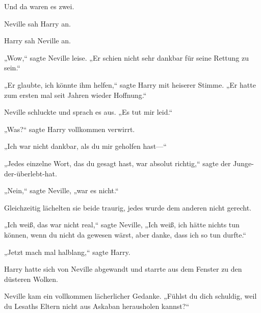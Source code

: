 Und da waren es zwei.

Neville sah Harry an.

Harry sah Neville an.

„Wow,“ sagte Neville leise. „Er schien nicht sehr dankbar für seine Rettung zu sein.“

„Er glaubte, ich könnte ihm helfen,“ sagte Harry mit heiserer Stimme. „Er hatte zum ersten mal seit Jahren wieder Hoffnung.“

Neville schluckte und sprach es aus. „Es tut mir leid.“

„Was?“ sagte Harry vollkommen verwirrt.

„Ich war nicht dankbar, als du mir geholfen hast—“

„Jedes einzelne Wort, das du gesagt hast, war absolut richtig,“ sagte der Junge-der-überlebt-hat.

„Nein,“ sagte Neville, „war es nicht.“

Gleichzeitig lächelten sie beide traurig, jedes wurde dem anderen nicht gerecht.

„Ich weiß, das war nicht real,“ sagte Neville, „Ich weiß, ich hätte nichts tun können, wenn du nicht da gewesen wärst, aber danke, dass ich so tun durfte.“

„Jetzt mach mal halblang,“ sagte Harry.

Harry hatte sich von Neville abgewandt und starrte aus dem Fenster zu den düsteren Wolken.

Neville kam ein vollkommen lächerlicher Gedanke. „Fühlst du dich schuldig, weil du Lesaths Eltern nicht aus Askaban herausholen kannst?“

